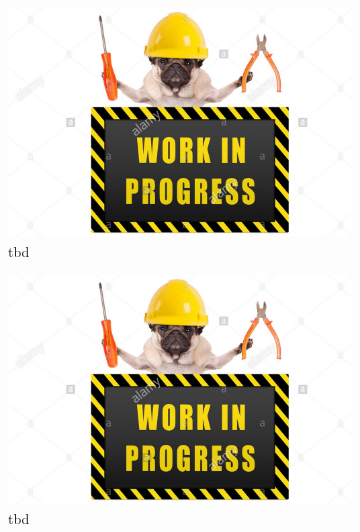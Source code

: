 \begin{figure} [b]
	\centering
	\begin{subfigure}[t]{0.3\textwidth}
		\centering
		\includegraphics[width=\textwidth]{figures/placeholder.png}
		\caption{
			tbd
		}
	\end{subfigure}
	\hfill
	\begin{subfigure}[t]{0.3\textwidth}
		\centering
		\includegraphics[width=\textwidth]{figures/placeholder.png}
		\caption{
			tbd
		}
	\end{subfigure}
	\hfill
	\begin{subfigure}[t]{0.3\textwidth}
		\centering

\end{subfigure}
\end{figure}
